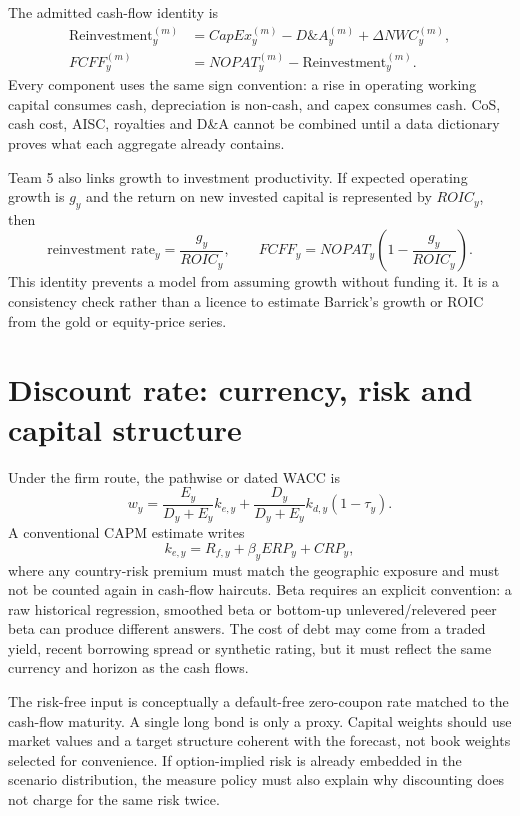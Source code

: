 The admitted cash-flow identity is
\begin{align}
\text{Reinvestment}_y^{(m)}
  &=CapEx_y^{(m)}-D\&A_y^{(m)}+\Delta NWC_y^{(m)},\\
FCFF_y^{(m)}
  &=NOPAT_y^{(m)}-\text{Reinvestment}_y^{(m)}.
\end{align}
Every component uses the same sign convention: a rise in operating working
capital consumes cash, depreciation is non-cash, and capex consumes cash. CoS,
cash cost, AISC, royalties and D\&A cannot be combined until a data dictionary
proves what each aggregate already contains.

Team 5 also links growth to investment productivity. If expected operating
growth is \(g_y\) and the return on new invested capital is represented by
\(ROIC_y\), then
\begin{equation}
\text{reinvestment rate}_y=\frac{g_y}{ROIC_y},
\qquad
FCFF_y=NOPAT_y\left(1-\frac{g_y}{ROIC_y}\right).
\end{equation}
This identity prevents a model from assuming growth without funding it. It is
a consistency check rather than a licence to estimate Barrick's growth or
ROIC from the gold or equity-price series.

\section{Discount rate: currency, risk and capital structure}

Under the firm route, the pathwise or dated WACC is
\begin{equation}
w_y=\frac{E_y}{D_y+E_y}k_{e,y}
  +\frac{D_y}{D_y+E_y}k_{d,y}(1-\tau_y).
\end{equation}
A conventional CAPM estimate writes
\begin{equation}
k_{e,y}=R_{f,y}+\beta_y ERP_y+CRP_y,
\end{equation}
where any country-risk premium must match the geographic exposure and must not
be counted again in cash-flow haircuts. Beta requires an explicit convention:
a raw historical regression, smoothed beta or bottom-up unlevered/relevered
peer beta can produce different answers. The cost of debt may come from a
traded yield, recent borrowing spread or synthetic rating, but it must reflect
the same currency and horizon as the cash flows.

The risk-free input is conceptually a default-free zero-coupon rate matched to
the cash-flow maturity. A single long bond is only a proxy. Capital weights
should use market values and a target structure coherent with the forecast,
not book weights selected for convenience. If option-implied risk is already
embedded in the scenario distribution, the measure policy must also explain
why discounting does not charge for the same risk twice.

